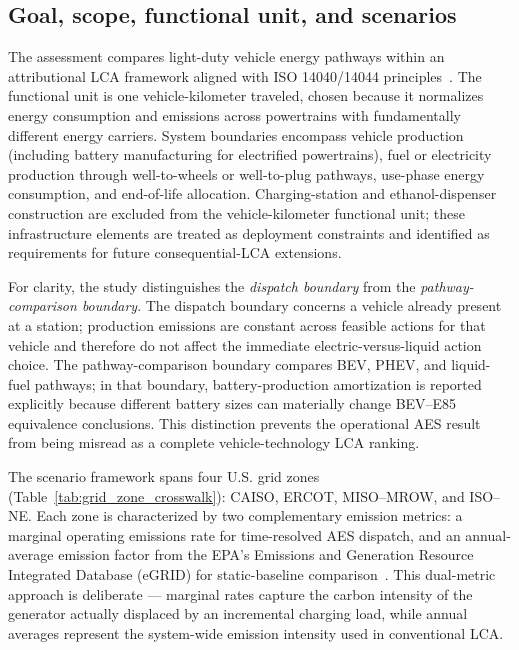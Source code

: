 \documentclass[cleantechnol,article,submit,pdftex,moreauthors]{Definitions/mdpi}
\begin{document}
\subsection{Goal, scope, functional unit, and scenarios}
\label{subsec:goal_scope}

The assessment compares light-duty vehicle energy pathways within an attributional LCA framework aligned with ISO 14040/14044 principles~\cite{ISO2006a,ISO2006b}. The functional unit is one vehicle-kilometer traveled, chosen because it normalizes energy consumption and emissions across powertrains with fundamentally different energy carriers. System boundaries encompass vehicle production (including battery manufacturing for electrified powertrains), fuel or electricity production through well-to-wheels or well-to-plug pathways, use-phase energy consumption, and end-of-life allocation. Charging-station and ethanol-dispenser construction are excluded from the vehicle-kilometer functional unit; these infrastructure elements are treated as deployment constraints and identified as requirements for future consequential-LCA extensions.

For clarity, the study distinguishes the \emph{dispatch boundary} from the \emph{pathway-comparison boundary}. The dispatch boundary concerns a vehicle already present at a station; production emissions are constant across feasible actions for that vehicle and therefore do not affect the immediate electric-versus-liquid action choice. The pathway-comparison boundary compares BEV, PHEV, and liquid-fuel pathways; in that boundary, battery-production amortization is reported explicitly because different battery sizes can materially change BEV--E85 equivalence conclusions. This distinction prevents the operational AES result from being misread as a complete vehicle-technology LCA ranking.

The scenario framework spans four U.S. grid zones (Table~\ref{tab:grid_zone_crosswalk}): CAISO, ERCOT, MISO--MROW, and ISO--NE. Each zone is characterized by two complementary emission metrics: a marginal operating emissions rate for time-resolved AES dispatch, and an annual-average emission factor from the EPA's Emissions and Generation Resource Integrated Database (eGRID) for static-baseline comparison~\cite{EPAeGRID2023}. This dual-metric approach is deliberate --- marginal rates capture the carbon intensity of the generator actually displaced by an incremental charging load, while annual averages represent the system-wide emission intensity used in conventional LCA.
\end{document}
